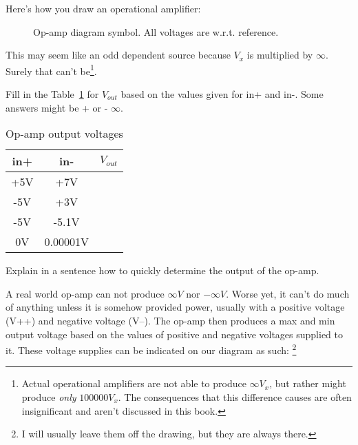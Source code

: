 Here's how you draw an operational amplifier:

\begin{figure}[H]
\begin{center}
\caption{Op-amp diagram symbol. All voltages are w.r.t. reference.}
\end{center}
\end{figure}

This may seem like an odd dependent source because $V_x$ is multiplied by $\infty$. Surely that can't be\footnote{Actual operational amplifiers are not able to produce $\infty V_x$, but rather might produce \emph{only} $100000 V_x$. The consequences that this difference causes are often insignificant and aren't discussed in this book.}.\par

\begin{blevel}
Fill in the Table~\ref{T:5OP} for $V_{out}$ based on the values given for in+ and in-. Some answers might be + or - $\infty$.
\end{blevel}

\begin{table}[H]
\begin{center}
\begin{tabular}{|c|c|c|}\hline
in+&in-&$V_{out}$\\ \hline
+5V&+7V& \\ \hline
-5V&+3V& \\ \hline
-5V&-5.1V& \\ \hline
0V&0.00001V& \\ \hline
\end{tabular}
\caption{Op-amp output voltages}
\label{T:5OP}
\end{center}
\end{table}

\begin{clevel}
Explain in a sentence how to quickly determine the output of the op-amp.
\end{clevel}

\par
A real world op-amp can not produce $\infty V$ nor $-\infty V$. Worse yet, it can't do much of anything unless it is somehow provided power, usually with a positive voltage (V++) and negative voltage (V--). The op-amp then produces a max and min output voltage based on the values of positive and negative voltages supplied to it. These voltage supplies can be indicated on our diagram as such: \footnote{I will usually leave them off the drawing, but they are always there.}\\

